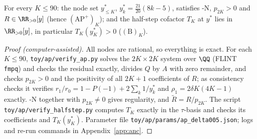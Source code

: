 \begin{proposition}\label{prop:AP-B-cert}
For every $K\le90$: the node set $y^*_{\le K}$, $y^*_k=\frac{21}{20}(8k-5)$, satisfies \hyp{N}, $p_{2K}>0$ and
$R\in\RR_{>0}[y]$ \textup{(}hence $(\mathrm{AP}^+)_K$\textup{)}; and the half-step cofactor $T_K$ at $y^*$ lies in
$\RR_{>0}[y]$, in particular $T_K(y^*_K)>0$ \textup{(}$(\mathrm B)_K$\textup{)}.
\end{proposition}

\begin{proof}[Proof \textup{(computer-assisted)}]
All nodes are rational, so everything is exact. For each $K\le90$, \nolinkurl{toy/ap/verify_ap.py} solves the
$2K\times2K$ system over $\QQ$ (FLINT \texttt{fmpq}) and checks the residual exactly, divides $Q$ by $A$ with zero
remainder, and checks $p_{2K}>0$ and the positivity of all $2K+1$ coefficients of $R$; as consistency checks it
verifies $r_1/r_0=1-P(-1)+2\sum_k1/y^*_k$ and $\rho_1=2\delta K(4K-1)$ exactly. \hyp{N} together with $p_{2K}\neq0$ gives
regularity, and $\tilde R=R/p_{2K}$. The script \nolinkurl{toy/ap/verify_halfstep.py} computes $T_K$ exactly in the
$\tau$-basis and checks its coefficients and $T_K(y^*_K)$. Parameter file \nolinkurl{toy/ap/params/ap_delta005.json}; logs
and re-run commands in Appendix~\ref{app:anc}.
\end{proof}

